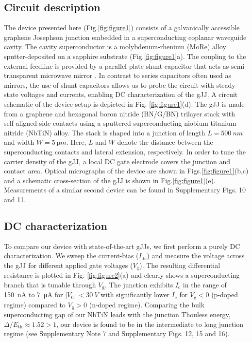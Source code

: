 \subsection{Circuit description}

The device presented here (Fig.\ref{fig:figure1}) consists of a galvanically accessible graphene Josephson junction embedded in a superconducting coplanar waveguide cavity.
The cavity superconductor is a molybdenum-rhenium (MoRe) alloy sputter-deposited on a sapphire substrate (Fig.\ref{fig:figure1}a).
The coupling to the external feedline is provided by a parallel plate shunt capacitor that acts as semi-transparent microwave mirror \cite{bosman_broadband_2015,singh_molybdenumrhenium_2014}.
In contrast to series capacitors often used as mirrors, the use of shunt capacitors allows us to probe the circuit with steady-state voltages and currents, enabling DC characterization of the gJJ.
A circuit schematic of the device setup is depicted in Fig. \ref{fig:figure1}(d).
The gJJ is made from a graphene and hexagonal boron nitride (BN/G/BN) trilayer stack with self-aligned side contacts \cite{pizzocchero_hot_2016,wang_onedimensional_2013} using a sputtered superconducting niobium titanium nitride (NbTiN) alloy.
The stack is shaped into a junction of length $L=\SI{500}{nm}$ and width $W=\SI{5}{\micro m}$.
Here, $L$ and $W$ denote the distance between the superconducting contacts and lateral extension, respectively.
In order to tune the carrier density of the gJJ, a local DC gate electrode covers the junction and contact area.
Optical micrographs of the device are shown in Figs.\ref{fig:figure1}(b,c) and a schematic cross-section of the gJJ is shown in Fig.\ref{fig:figure1}(e).
Measurements of a similar second device can be found in Supplementary Figs. 10 and 11.

\subsection{DC characterization}

To compare our device with state-of-the-art gJJs, we first perform a purely DC characterization.
We sweep the current-bias ($I_\text{dc}$) and measure the voltage across the gJJ for different applied gate voltages ($V_\text{g}$).
The resulting differential resistance is plotted in Fig. \ref{fig:figure2}(a) and clearly shows a superconducting branch that is tunable through $V_\text{g}$.
The junction exhibits $I_\text{c}$ in the range of \SI{150}{nA} to \SI{7}{\micro A} for $\lvert V_\mathrm{G} \rvert<\SI{30}{V}$ with significantly lower $I_\text{c}$ for $V_\text{g}<0$ (p-doped regime) compared to $V_\text{g}>0$ (n-doped regime).
Comparing the bulk superconducting gap of our NbTiN leads with the junction Thouless energy, $\Delta/E_\text{th}\approx1.52>1$, our device is found to be in the intermediate to long junction regime (see Supplementary Note 7 and Supplementary Figs. 12, 15 and 16).

